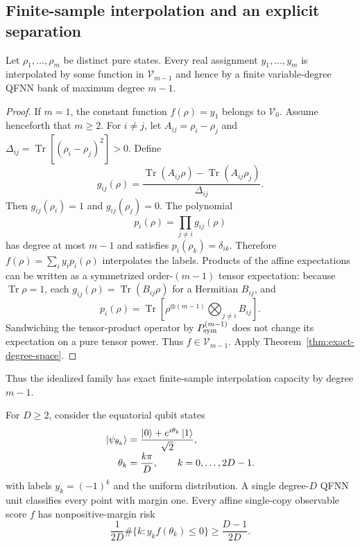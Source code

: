 \documentclass[pdflatex,sn-mathphys,NameDate,iicol]{sn-jnl}
\newcommand{\Tr}{\operatorname{Tr}}
\newcommand{\cV}{\mathcal{V}}
\begin{document}
\subsection{Finite-sample interpolation and an explicit separation}

\begin{corollary}
\label{cor:finite-interpolation}
Let $\rho_1,\ldots,\rho_m$ be distinct pure states. Every real assignment
$y_1,\ldots,y_m$ is interpolated by some function in $\cV_{m-1}$ and hence
by a finite variable-degree QFNN bank of maximum degree $m-1$.
\end{corollary}

\begin{proof}
If $m=1$, the constant function $f(\rho)=y_1$ belongs to $\cV_0$.
Assume henceforth that $m\ge2$.
For $i\ne j$, let
$A_{ij}=\rho_i-\rho_j$ and
$\Delta_{ij}=\Tr[(\rho_i-\rho_j)^2]>0$. Define
\begin{equation}
  g_{ij}(\rho)
  =
  \frac{
    \Tr(A_{ij}\rho)-\Tr(A_{ij}\rho_j)
  }{\Delta_{ij}}.
\end{equation}
Then $g_{ij}(\rho_i)=1$ and $g_{ij}(\rho_j)=0$. The polynomial
\begin{equation}
  p_i(\rho)=\prod_{j\ne i}g_{ij}(\rho)
\end{equation}
has degree at most $m-1$ and satisfies
$p_i(\rho_k)=\delta_{ik}$. Therefore
$f(\rho)=\sum_i y_i p_i(\rho)$ interpolates the labels. Products of the
affine expectations can be written as a symmetrized order-$(m-1)$ tensor
expectation: because $\Tr\rho=1$, each
$g_{ij}(\rho)=\Tr(B_{ij}\rho)$ for a Hermitian $B_{ij}$, and
\begin{equation}
 p_i(\rho)
 =\Tr\!\left[
   \rho^{\otimes(m-1)}
   \bigotimes_{j\ne i}B_{ij}
  \right].
\end{equation}
Sandwiching the tensor-product operator by $P_{\rm sym}^{(m-1)}$ does not
change its expectation on a pure tensor power. Thus $f\in\cV_{m-1}$. Apply
Theorem~\ref{thm:exact-degree-space}.
\end{proof}

Thus the idealized family has exact finite-sample interpolation capacity by
degree $m-1$.

\begin{proposition}
\label{prop:alternating}
For $D\ge2$, consider the equatorial qubit states
\begin{equation}
\begin{aligned}
  \ket{\psi_{\theta_k}}
  &=\frac{\ket0+e^{i\theta_k}\ket1}{\sqrt2},\\[-1mm]
  \theta_k&=\frac{k\pi}{D},
  \qquad k=0,\ldots,2D-1.
\end{aligned}
\end{equation}
with labels $y_k=(-1)^k$ and the uniform distribution. A single degree-$D$
QFNN unit classifies every point with margin one. Every affine
single-copy observable score $f$ has nonpositive-margin risk
\begin{equation}
  \frac{1}{2D}
  \#\{k:y_k f(\theta_k)\le0\}
  \ge
  \frac{D-1}{2D}.
  \label{eq:alternating-risk}
\end{equation}
\end{proposition}
\end{document}
